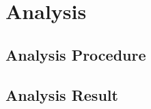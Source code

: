 \chapter{Analysis}
\label{analysis_chapter}

\section{Analysis Procedure}
\label{anaproc}


\section{Analysis Result}
\label{neymanana}

